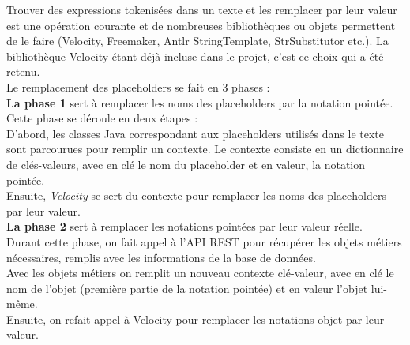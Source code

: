 Trouver des expressions tokenisées dans un texte et les remplacer par leur valeur est une opération courante et de nombreuses bibliothèques ou objets permettent de le faire (Velocity, Freemaker, Antlr StringTemplate, StrSubstitutor etc.).
La bibliothèque Velocity étant déjà incluse dans le projet, c'est ce choix qui a été retenu.\\

Le remplacement des placeholders se fait en 3 phases : \\

\textbf{La phase 1} sert à remplacer les noms des placeholders par la notation pointée.\\
Cette phase se déroule en deux étapes : \\
D'abord, les classes Java correspondant aux placeholders utilisés dans le texte sont parcourues pour remplir un contexte. Le contexte consiste en un dictionnaire de clés-valeurs, avec en clé le nom du placeholder et en valeur, la notation pointée.\\
Ensuite, \textit{Velocity} se sert du contexte pour remplacer les noms des placeholders par leur valeur.\\

\textbf{La phase 2} sert à remplacer les notations pointées par leur valeur réelle.\\
Durant cette phase, on fait appel à l'API REST pour récupérer les objets métiers nécessaires, remplis avec les informations de la base de données.\\
Avec les objets métiers on remplit un nouveau contexte clé-valeur, avec en clé le nom de l'objet (première partie de la notation pointée) et en valeur l'objet lui-même.\\
Ensuite, on refait appel à Velocity pour remplacer les notations objet par leur valeur.\\

